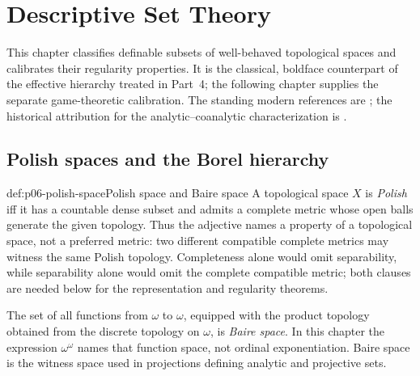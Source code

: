 
\chapter{Descriptive Set Theory}
\label{sec:p06-descriptive-set-theory}

This chapter classifies definable subsets of well-behaved topological spaces
and calibrates their regularity properties.  It is the classical, boldface
counterpart of the effective hierarchy treated in Part~4; the following
chapter supplies the separate game-theoretic calibration.
The standing modern references are \cite{Kechris1995,Moschovakis2009}; the
historical attribution for the analytic--coanalytic characterization is
\cite{Suslin1917}.

\section{Polish spaces and the Borel hierarchy}
\label{sec:p06-polish-borel}

\begin{hbdefinition}{def:p06-polish-space}{Polish space and Baire space}
A topological space \(X\) is \emph{Polish} iff it has a countable dense subset
and admits a complete metric whose open balls generate the given topology.
Thus the adjective names a property of a topological space, not a preferred
metric: two different compatible complete metrics may witness the same Polish
topology.  Completeness alone would omit separability, while separability alone
would omit the complete compatible metric; both clauses are needed below for
the representation and regularity theorems.

The set of all functions from \(\omega\) to \(\omega\), equipped with the
product topology obtained from the discrete topology on \(\omega\), is
\emph{Baire space}.  In this chapter the expression \(\omega^\omega\) names
that function space, not ordinal exponentiation.  Baire space is the witness
space used in projections defining analytic and projective sets.
\end{hbdefinition}

